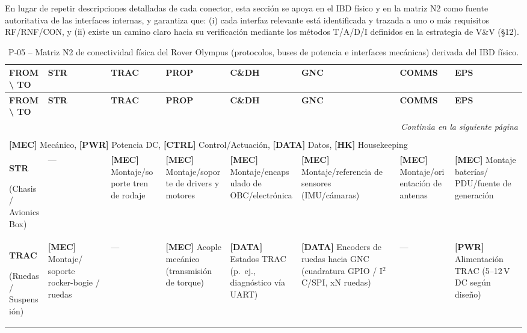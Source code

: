 En lugar de repetir descripciones detalladas de cada conector, esta sección se apoya en el IBD físico y en la matriz N2 como fuente autoritativa de las interfaces internas, y garantiza que:
(i) cada interfaz relevante está identificada y trazada a uno o más requisitos RF/RNF/CON, y
(ii) existe un camino claro hacia su verificación mediante los métodos T/A/D/I definidos en la estrategia de V\&V (§12).

\begin{landscape}
\scriptsize
\renewcommand{\arraystretch}{1.2}
\setlength{\tabcolsep}{2pt}

\begin{longtable}{|p{2.3cm}||p{2.9cm}|p{2.9cm}|p{2.9cm}|p{2.9cm}|p{2.9cm}|p{2.9cm}|p{2.9cm}|}
\caption{P‑05 – Matriz N2 de conectividad física del Rover Olympus (protocolos, buses de potencia e interfaces mecánicas) derivada del IBD físico.}\label{tab:n2_fisica}\\
\hline
\textbf{FROM \textbackslash{} TO} & \textbf{STR} & \textbf{TRAC} & \textbf{PROP} & \textbf{C\&DH} & \textbf{GNC} & \textbf{COMMS} & \textbf{EPS} \\ \hline
\hline
\endfirsthead

\hline
\textbf{FROM \textbackslash{} TO} & \textbf{STR} & \textbf{TRAC} & \textbf{PROP} & \textbf{C\&DH} & \textbf{GNC} & \textbf{COMMS} & \textbf{EPS} \\ \hline
\hline
\endhead

\hline
\multicolumn{8}{r}{\textit{Continúa en la siguiente página}}\\
\endfoot

\hline
\multicolumn{8}{l}{\textbf{Leyenda de tipos de interfaz:}} \\
\multicolumn{8}{l}{\textbf{[MEC]} Mecánico, \textbf{[PWR]} Potencia DC, \textbf{[CTRL]} Control/Actuación, \textbf{[DATA]} Datos, \textbf{[HK]} Housekeeping} \\
\endlastfoot

\textbf{STR}\par(Chasis / Avionics Box) & --- & \textbf{[MEC]} Montaje/soporte tren de rodaje & \textbf{[MEC]} Montaje/soporte de drivers y motores & \textbf{[MEC]} Montaje/encapsulado de OBC/electrónica & \textbf{[MEC]} Montaje/referencia de sensores (IMU/cámaras) & \textbf{[MEC]} Montaje/orientación de antenas & \textbf{[MEC]} Montaje baterías/ PDU/fuente de generación \\ \hline

\textbf{TRAC}\par(Ruedas / Suspensión) & \textbf{[MEC]} Montaje/ soporte rocker-bogie / ruedas & --- & \textbf{[MEC]} Acople mecánico (transmisión de torque) & \textbf{[DATA]} Estados TRAC (p.\ ej., diagnóstico vía UART) & \textbf{[DATA]} Encoders de ruedas hacia GNC (cuadratura GPIO / I$^2$C/SPI, xN ruedas) & --- & \textbf{[PWR]} Alimentación TRAC (5--12\,V DC según diseño) \\ \hline


\end{longtable}
\end{landscape}
